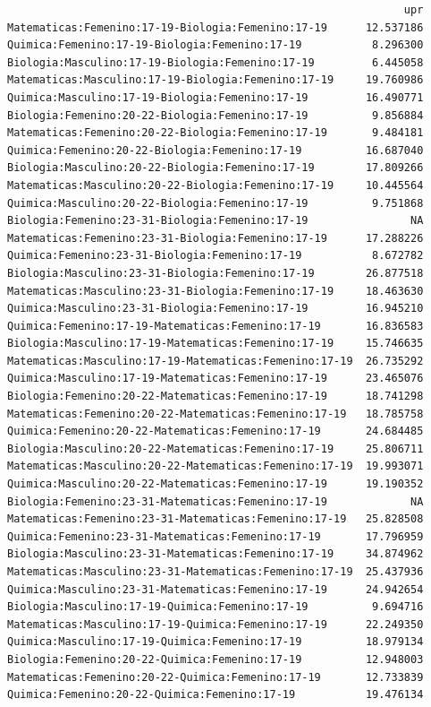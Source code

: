 \documentclass{rapport}
\begin{document}
\begin{itemize}
\begin{verbatim}
                                                              upr
Matematicas:Femenino:17-19-Biologia:Femenino:17-19      12.537186
Quimica:Femenino:17-19-Biologia:Femenino:17-19           8.296300
Biologia:Masculino:17-19-Biologia:Femenino:17-19         6.445058
Matematicas:Masculino:17-19-Biologia:Femenino:17-19     19.760986
Quimica:Masculino:17-19-Biologia:Femenino:17-19         16.490771
Biologia:Femenino:20-22-Biologia:Femenino:17-19          9.856884
Matematicas:Femenino:20-22-Biologia:Femenino:17-19       9.484181
Quimica:Femenino:20-22-Biologia:Femenino:17-19          16.687040
Biologia:Masculino:20-22-Biologia:Femenino:17-19        17.809266
Matematicas:Masculino:20-22-Biologia:Femenino:17-19     10.445564
Quimica:Masculino:20-22-Biologia:Femenino:17-19          9.751868
Biologia:Femenino:23-31-Biologia:Femenino:17-19                NA
Matematicas:Femenino:23-31-Biologia:Femenino:17-19      17.288226
Quimica:Femenino:23-31-Biologia:Femenino:17-19           8.672782
Biologia:Masculino:23-31-Biologia:Femenino:17-19        26.877518
Matematicas:Masculino:23-31-Biologia:Femenino:17-19     18.463630
Quimica:Masculino:23-31-Biologia:Femenino:17-19         16.945210
Quimica:Femenino:17-19-Matematicas:Femenino:17-19       16.836583
Biologia:Masculino:17-19-Matematicas:Femenino:17-19     15.746635
Matematicas:Masculino:17-19-Matematicas:Femenino:17-19  26.735292
Quimica:Masculino:17-19-Matematicas:Femenino:17-19      23.465076
Biologia:Femenino:20-22-Matematicas:Femenino:17-19      18.741298
Matematicas:Femenino:20-22-Matematicas:Femenino:17-19   18.785758
Quimica:Femenino:20-22-Matematicas:Femenino:17-19       24.684485
Biologia:Masculino:20-22-Matematicas:Femenino:17-19     25.806711
Matematicas:Masculino:20-22-Matematicas:Femenino:17-19  19.993071
Quimica:Masculino:20-22-Matematicas:Femenino:17-19      19.190352
Biologia:Femenino:23-31-Matematicas:Femenino:17-19             NA
Matematicas:Femenino:23-31-Matematicas:Femenino:17-19   25.828508
Quimica:Femenino:23-31-Matematicas:Femenino:17-19       17.796959
Biologia:Masculino:23-31-Matematicas:Femenino:17-19     34.874962
Matematicas:Masculino:23-31-Matematicas:Femenino:17-19  25.437936
Quimica:Masculino:23-31-Matematicas:Femenino:17-19      24.942654
Biologia:Masculino:17-19-Quimica:Femenino:17-19          9.694716
Matematicas:Masculino:17-19-Quimica:Femenino:17-19      22.249350
Quimica:Masculino:17-19-Quimica:Femenino:17-19          18.979134
Biologia:Femenino:20-22-Quimica:Femenino:17-19          12.948003
Matematicas:Femenino:20-22-Quimica:Femenino:17-19       12.733839
Quimica:Femenino:20-22-Quimica:Femenino:17-19           19.476134

\end{verbatim}
\end{itemize}
\end{document}
